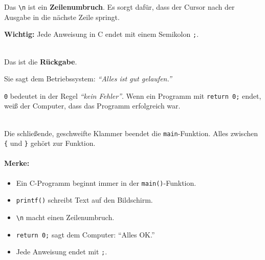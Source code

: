 \begin{description}
        Das \texttt{\backslash n} ist ein \textbf{Zeilenumbruch}.
        Es sorgt dafür, dass der Cursor nach der Ausgabe in die nächste Zeile springt.

        \textbf{Wichtig:} Jede Anweisung in C endet mit einem Semikolon \texttt{;}.

    \item[\texttt{return 0;}]\hfill\\
        Das ist die \textbf{Rückgabe}.

        Sie sagt dem Betriebssystem: \textit{``Alles ist gut gelaufen.''}

        \texttt{0} bedeutet in der Regel \textit{``kein Fehler''}.
        Wenn ein Programm mit \texttt{return 0;} endet, weiß der Computer,
        dass das Programm erfolgreich war.

    \item[\texttt{\}} ]\hfill\\
        Die schließende, geschweifte Klammer beendet die \texttt{main}-Funktion.
        Alles zwischen \texttt{\{} und \texttt{\}} gehört zur Funktion.
\end{description}

\paragraph{Merke:}

\begin{itemize}[noitemsep]
    \item Ein C-Programm beginnt immer in der \texttt{main()}-Funktion.
    \item \texttt{printf()} schreibt Text auf den Bildschirm.
    \item \texttt{\backslash n} macht einen Zeilenumbruch.
    \item \texttt{return 0;} sagt dem Computer: ``Alles OK.''
    \item Jede Anweisung endet mit \texttt{;}.
\end{itemize}

